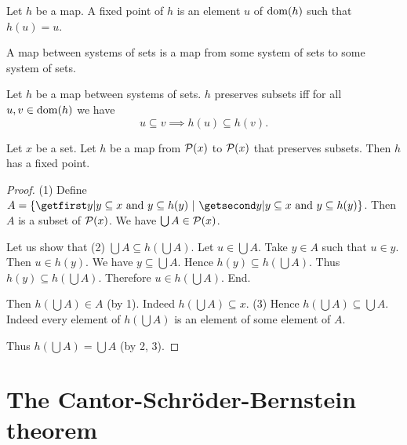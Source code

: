 \documentclass{article}
\begin{document}
  \begin{forthel}
    \begin{definition}
      Let $h$ be a map.
      A fixed point of $h$ is an element $u$ of $\operatorname{dom}(h)$ such that $h(u) = u$.
    \end{definition}

    \begin{definition}
      A map between systems of sets is a map from some system of sets to some
      system of sets.
    \end{definition}

    \begin{definition}
      Let $h$ be a map between systems of sets.
      $h$ preserves subsets iff for all $u, v \in \operatorname{dom}(h)$
      we have \[ u \subseteq v \implies h(u) \subseteq h(v). \]
    \end{definition}

    \begin{theorem}\label{KT}
      Let $x$ be a set.
      Let $h$ be a map from $\mathcal{P}(x)$ to $\mathcal{P}(x)$ that preserves subsets.
      Then $h$ has a fixed point.
    \end{theorem}
    \begin{proof}
      (1) Define $A = \class{y | \text{$y \subseteq x$ and
      $y \subseteq h(y)$}}$.
      Then $A$ is a subset of $\mathcal{P}(x)$.
      We have $\bigcup A \in \mathcal{P}(x)$.

      Let us show that (2) $\bigcup A \subseteq h(\bigcup A)$.
        Let $u \in \bigcup A$.
        Take $y \in A$ such that $u \in y$.
        Then $u \in h(y)$.
        We have $y \subseteq \bigcup A$.
        Hence $h(y) \subseteq h(\bigcup A)$.
        Thus $h(y) \subseteq h(\bigcup A)$.
        Therefore $u \in h(\bigcup A)$.
      End.

      Then $h(\bigcup A) \in A$ (by 1).
      Indeed $h(\bigcup A) \subseteq x$.
      (3) Hence $h(\bigcup A) \subseteq \bigcup A$.
      Indeed every element of $h(\bigcup A)$ is an element of some element of
      $A$.

      Thus $h(\bigcup A) = \bigcup A$ (by 2, 3).
    \end{proof}
  \end{forthel}


  \section*{The Cantor-Schröder-Bernstein theorem}
\end{document}
